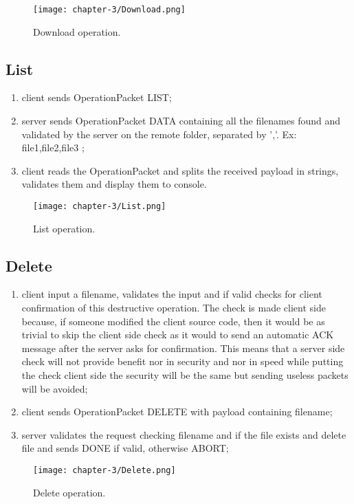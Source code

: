 \begin{figure}[!h] 
    \centering 
    \texttt{[image: chapter-3/Download.png]} 
    \caption{Download operation.}
    \label{fig:download_operation}
\end{figure}
\newpage{}
\subsection{List}
\begin{enumerate}
	\item client sends OperationPacket LIST;
	\item server sends OperationPacket DATA containing all the filenames found and validated by the server on the remote folder, separated by ','. Ex: file1,file2,file3 ;
	\item client reads the OperationPacket and splits the received payload in strings, validates them and display them to console.
	
\end{enumerate}
\begin{figure}[!h] 
    \centering 
    \texttt{[image: chapter-3/List.png]} 
    \caption{List operation.}
    \label{fig:list_operation}
\end{figure}

\subsection{Delete}
\begin{enumerate}
	\item client input a filename, validates the input and if valid checks for client confirmation of this destructive operation. The check is made client side because, if someone modified the client source code, then it would be as trivial to skip the client side check as it would to send an automatic ACK message after the server asks for confirmation. This means that a server side check will not provide benefit nor in security and nor in speed while putting the check client side the security will be the same but sending useless packets will be avoided;
	\item client sends OperationPacket DELETE with payload containing filename;
	\item server validates the request checking filename and if the file exists and delete file and sends DONE if valid, otherwise ABORT;
\end{enumerate}

\begin{figure}[!h] 
    \centering 
    \texttt{[image: chapter-3/Delete.png]} 
    \caption{Delete operation.}
    \label{fig:delete_operation}
\end{figure}

